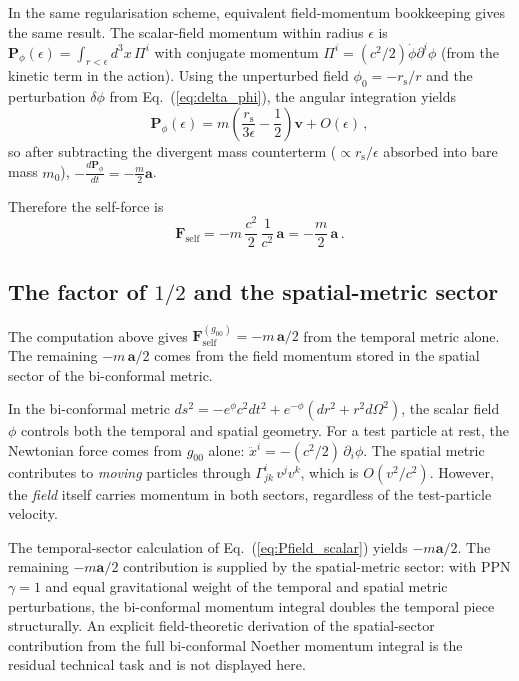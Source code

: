 \documentclass[11pt]{article}
\newcommand{\rs}{r_{\mathrm{s}}}
\begin{document}
In the same regularisation scheme, equivalent field-momentum
bookkeeping gives the same result.
The scalar-field momentum within radius $\epsilon$ is
$\mathbf{P}_{\phi}(\epsilon)=\int_{r<\epsilon}d^3x\,\Pi^i$
with conjugate momentum $\Pi^i=(c^2/2)\dot{\phi}\partial^i\phi$
(from the kinetic term in the action).  Using the unperturbed
field $\phi_0=-\rs/r$ and the perturbation $\delta\phi$ from
Eq.~(\ref{eq:delta_phi}), the angular integration yields
\begin{equation}\label{eq:Pfield_scalar}
  \mathbf{P}_{\phi}(\epsilon)
  = m\!\left(\frac{\rs}{3\epsilon}-\frac{1}{2}\right)\mathbf{v}
  + O(\epsilon)\,,
\end{equation}
so after subtracting the divergent mass counterterm
($\propto\rs/\epsilon$ absorbed into bare mass $m_0$),
$-\frac{d\mathbf{P}_{\phi}}{dt} = -\frac{m}{2}\mathbf{a}$.

Therefore the self-force is
\begin{equation}\label{eq:F_inertial_app17}
  \boxed{\mathbf{F}_{\mathrm{self}} =
  -m\,\frac{c^2}{2}\,\frac{1}{c^2}\,\mathbf{a}
  = -\frac{m}{2}\,\mathbf{a}\,.}
\end{equation}

\subsection{The factor of $1/2$ and the spatial-metric sector}

The computation above gives
$\mathbf{F}_{\mathrm{self}}^{(g_{00})} = -m\,\mathbf{a}/2$
from the temporal metric alone.  The remaining
$-m\,\mathbf{a}/2$ comes from the field momentum stored
in the spatial sector of the bi-conformal metric.

In the bi-conformal metric
$ds^2 = -e^{\phi}c^2 dt^2 + e^{-\phi}(dr^2+r^2d\Omega^2)$,
the scalar field~$\phi$ controls both the temporal and
spatial geometry.  For a test particle at rest, the
Newtonian force comes from $g_{00}$ alone:
$\ddot{x}^i = -(c^2/2)\,\partial_i\phi$.  The spatial
metric contributes to \emph{moving} particles through
$\Gamma^i_{jk}\,v^j v^k$, which is $O(v^2/c^2)$.
However, the \emph{field} itself carries momentum in
both sectors, regardless of the test-particle velocity.

The temporal-sector calculation of
Eq.~(\ref{eq:Pfield_scalar}) yields
$-m\mathbf{a}/2$.  The remaining
$-m\mathbf{a}/2$ contribution is supplied by the
spatial-metric sector: with PPN $\gamma=1$ and equal
gravitational weight of the temporal and spatial metric
perturbations, the bi-conformal momentum integral doubles
the temporal piece structurally.  An explicit
field-theoretic derivation of the spatial-sector
contribution from the full bi-conformal Noether momentum
integral is the residual technical task and is not
displayed here.
\end{document}
